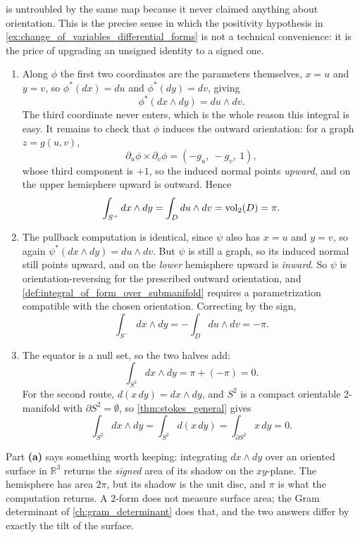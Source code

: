 \begin{exercisesolution}
\begin{enumerate}[label=\textbf{(\alph*)}]
     is untroubled by the same map because it never claimed
    anything about orientation. This is the precise sense in which the positivity hypothesis in
    \cref{ex:change_of_variables_differential_forms} is not a technical convenience: it is the price of upgrading an unsigned
    identity to a signed one.
\end{enumerate}
\end{exercisesolution}

\begin{exercisesolution}
\label{sol:ai_area_form_over_hemisphere}
\begin{enumerate}[label=\textbf{(\alph*)}]
  \item Along $\phi$ the first two coordinates are the parameters themselves, $x = u$ and
    $y = v$, so $\phi^*(dx) = du$ and $\phi^*(dy) = dv$, giving
    \[\phi^*(dx\wedge dy) = du\wedge dv.\]
    The third coordinate never enters, which is the whole reason this integral is easy. It
    remains to check that $\phi$ induces the outward orientation: for a graph $z = g(u,v)$,
    \[\partial_u\phi\times\partial_v\phi = (-g_u,\ -g_v,\ 1),\]
    whose third component is $+1$, so the induced normal points \emph{upward}, and on the upper
    hemisphere upward is outward. Hence
    \[\int_{S^+} dx\wedge dy = \int_D du\wedge dv = \operatorname{vol}_2(D) = \pi.\]
  \item The pullback computation is identical, since $\psi$ also has $x = u$ and $y = v$,
    so again $\psi^*(dx\wedge dy) = du\wedge dv$. But $\psi$ is still a graph, so its induced
    normal still points upward, and on the \emph{lower} hemisphere upward is \emph{inward}. So
    $\psi$ is orientation-reversing for the prescribed outward orientation, and
    \cref{def:integral_of_form_over_submanifold} requires a parametrization compatible with the
    chosen orientation. Correcting by the sign,
    \[\int_{S^-} dx\wedge dy = -\int_D du\wedge dv = -\pi.\]
  \item The equator is a null set, so the two halves add:
    \[\int_{S^2} dx\wedge dy = \pi + (-\pi) = 0.\]
    For the second route, $d(x\,dy) = dx\wedge dy$, and $S^2$ is a compact orientable $2$-manifold
    with $\partial S^2 = \emptyset$, so \cref{thm:stokes_general} gives
    \[\int_{S^2} dx\wedge dy = \int_{S^2} d(x\,dy) = \int_{\partial S^2} x\,dy = 0.\]
\end{enumerate}

\begin{remark}
\label{rem:area_form_measures_the_shadow}
Part \textbf{(a)} says something worth keeping: integrating $dx\wedge dy$ over an oriented
surface in $\mathbb{R}^3$ returns the \emph{signed} area of its shadow on the $xy$-plane. The
hemisphere has area $2\pi$, but its shadow is the unit disc, and $\pi$ is what the computation
returns. A $2$-form does not measure surface area; the Gram determinant of
\cref{ch:gram_determinant} does that, and the two answers differ by exactly the tilt of the
surface.


\end{remark}
\end{exercisesolution}
